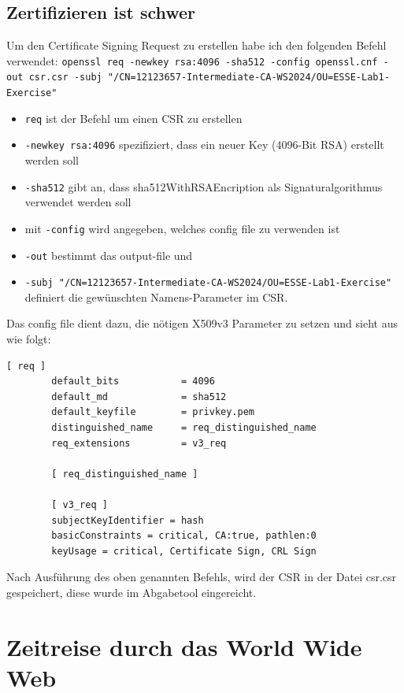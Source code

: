 \documentclass[12pt, a4paper, titlepage, oneside]{scrartcl}
\begin{document}
	\subsection{Zertifizieren ist schwer}
	Um den Certificate Signing Request zu erstellen habe ich den folgenden Befehl
	verwendet: \lstinline{openssl req -newkey rsa:4096 -sha512 -config openssl.cnf -out csr.csr -subj "/CN=12123657-Intermediate-CA-WS2024/OU=ESSE-Lab1-Exercise"}
	\begin{itemize}
		\item \lstinline{req} ist der Befehl um einen CSR zu erstellen

		\item \lstinline{-newkey rsa:4096} spezifiziert, dass ein neuer Key (4096-Bit
			RSA) erstellt werden soll

		\item \lstinline{-sha512} gibt an, dass sha512WithRSAEncription als Signaturalgorithmus
			verwendet werden soll

		\item mit \lstinline{-config} wird angegeben, welches config file zu verwenden
			ist

		\item \lstinline{-out} bestimmt das output-file und

		\item \lstinline{-subj "/CN=12123657-Intermediate-CA-WS2024/OU=ESSE-Lab1-Exercise"}
			definiert die gewünschten Namens-Parameter im CSR.
	\end{itemize}
	Das config file dient dazu, die nötigen X509v3 Parameter zu setzen und sieht aus
	wie folgt:
	\begin{lstlisting}[caption=openssl.cnf,label=code:opensslConfig,style=simple]
		[ req ]
		default_bits           = 4096
		default_md             = sha512
		default_keyfile        = privkey.pem
		distinguished_name     = req_distinguished_name
		req_extensions         = v3_req

		[ req_distinguished_name ]

		[ v3_req ]
		subjectKeyIdentifier = hash
		basicConstraints = critical, CA:true, pathlen:0
		keyUsage = critical, Certificate Sign, CRL Sign
	\end{lstlisting}
	Nach Ausführung des oben genannten Befehls, wird der CSR in der Datei csr.csr gespeichert,
	diese wurde im Abgabetool eingereicht.

	\section{Zeitreise durch das World Wide Web}
\end{document}
